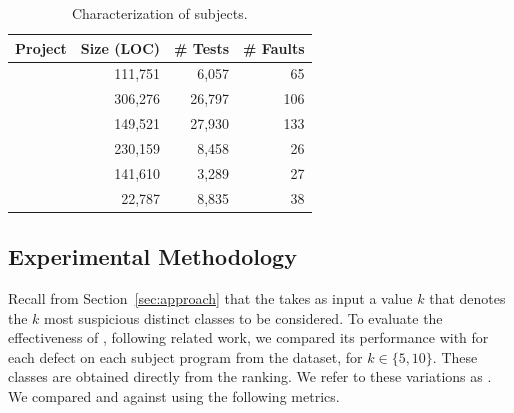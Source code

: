 \documentclass{article}
\begin{document}
\newcommand{\cgray}[1]{\cellcolor{gray!25}#1}
\begin{table}[h]
  \centering
  \setlength{\tabcolsep}{4pt}
    \begin{tabular}{lrrr}
      \toprule
      Project            & Size (LOC) & \# Tests & \# Faults \\ %
      \midrule
      \lang{}            & 111,751  & 6,057 & 65       \\   %
      \cmath{}           & 306,276  & 26,797 & 106     \\   %
      \closure{}         & 149,521  & 27,930  & 133     \\   %
      \chart{}           & 230,159  & 8,458 & 26      \\  %
      \jtime{}           & 141,610  & 3,289 & 27       \\   %
      \mockito{}         & 22,787  & 8,835 & 38    \\     %
      \bottomrule
  \end{tabular}
\caption {Characterization of \dfj{} subjects.}
\label{tab:df4j}
\end{table}
\normalsize


\subsection{Experimental Methodology}\label{sec:methodology}


Recall from Section~\ref{sec:approach} that the \comb{}
takes as input a value $k$ that denotes the $k$ most suspicious distinct
classes to be considered. To evaluate the effectiveness of \comb{}, following
related work, we compared its
performance with \sfl{} for each defect on each subject program from
the dataset, for $k\in\{5,10\}$. These classes are obtained directly
from the ranking. We refer to these variations as . We
compared  and  against \sfl{} using the
following metrics.
\end{document}
